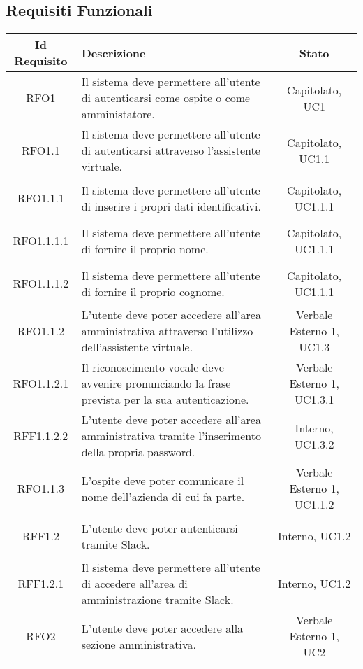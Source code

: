 \subsection{Requisiti Funzionali}
\normalsize
\begin{longtable}{|c|>{\centering}m{7cm}|c|}
	\hline
	\textbf{Id Requisito} & \textbf{Descrizione} & \textbf{Stato}\\
	\hline
	\endhead\hypertarget{RFO1}{RFO1} & Il sistema deve permettere all'utente di autenticarsi come ospite o come amministatore. & Capitolato, UC1\\ \hline
	\hypertarget{RFO1.1}{RFO1.1} & Il sistema deve permettere all'utente di autenticarsi attraverso l'assistente virtuale. & Capitolato, UC1.1\\ \hline
	\hypertarget{RFO1.1.1}{RFO1.1.1} & Il sistema deve permettere all'utente di inserire i propri dati identificativi. & Capitolato, UC1.1.1\\ \hline
	\hypertarget{RFO1.1.1.1}{RFO1.1.1.1} & Il sistema deve permettere all'utente di fornire il proprio nome. & Capitolato, UC1.1.1\\ \hline
	\hypertarget{RFO1.1.1.2}{RFO1.1.1.2} & Il sistema deve permettere all'utente di fornire il proprio cognome. & Capitolato, UC1.1.1\\ \hline
	\hypertarget{RFO1.1.2}{RFO1.1.2} & L'utente deve poter accedere all'area amministrativa attraverso l'utilizzo dell'assistente virtuale. & Verbale Esterno 1, UC1.3\\ \hline
	\hypertarget{RFO1.1.2.1}{RFO1.1.2.1} & Il riconoscimento vocale deve avvenire pronunciando la frase prevista per la sua autenticazione. & Verbale Esterno 1, UC1.3.1\\ \hline
	\hypertarget{RFF1.1.2.2}{RFF1.1.2.2} & L'utente deve poter accedere all'area amministrativa tramite l'inserimento della propria password. & Interno, UC1.3.2\\ \hline
	\hypertarget{RFO1.1.3}{RFO1.1.3} & L'ospite deve poter comunicare il nome dell'azienda di cui fa parte. & Verbale Esterno 1, UC1.1.2\\ \hline
	\hypertarget{RFF1.2}{RFF1.2} & L'utente deve poter autenticarsi tramite Slack. & Interno, UC1.2\\ \hline
	\hypertarget{RFF1.2.1}{RFF1.2.1} & Il sistema deve permettere all'utente di accedere all'area di amministrazione tramite Slack. & Interno, UC1.2\\ \hline
	\hypertarget{RFO2}{RFO2} & L'utente deve poter accedere alla sezione amministrativa. & Verbale Esterno 1, UC2\\ \hline

\end{longtable}
